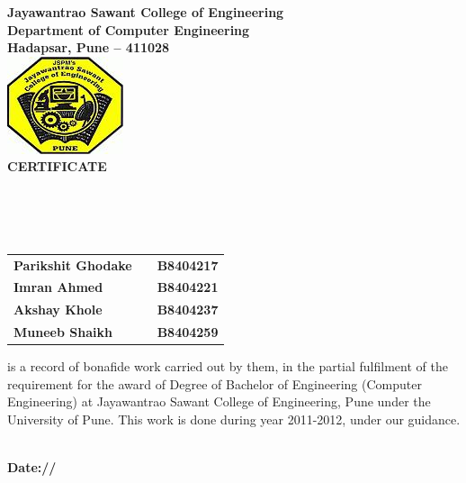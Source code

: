 \begin{center}
\thispagestyle{empty}

\LARGE{\textbf{Jayawantrao Sawant College of Engineering}} \\ 
\large{\textbf{Department of Computer Engineering}}\\
\large{\textbf{Hadapsar, Pune – 411028}}\\[0.5cm]

\includegraphics[scale=0.5]{project/images/jscoe_logo}\\[0.5cm]

{\Huge \textbf{CERTIFICATE}}\\[0.5cm]
\end{center}
\linespread{1.13}
\large{\\[0.2cm]
\textbf{\Large{}}\\[0.2cm]
\\[0.2cm]
\begin{table}[h]
\centering
\large{
\begin{tabular}{>{\bfseries}lc>{\bfseries}r}
Parikshit Ghodake & & B8404217\\Imran Ahmed & & B8404221\\Akshay Khole & & B8404237\\Muneeb Shaikh & & B8404259\\
\end{tabular}}
\end{table}
 is a record of bonafide work carried out by them, in the partial
 fulfilment of the requirement for the award of Degree of Bachelor of
 Engineering (Computer Engineering) at Jayawantrao Sawant College of
 Engineering, Pune under the University of Pune. This work is done
 during year 2011-2012, under our guidance.}\\[0.5cm]
\large{\textbf{Date:\hspace*{1.0cm}/\hspace*{1.0cm}/}}\\
